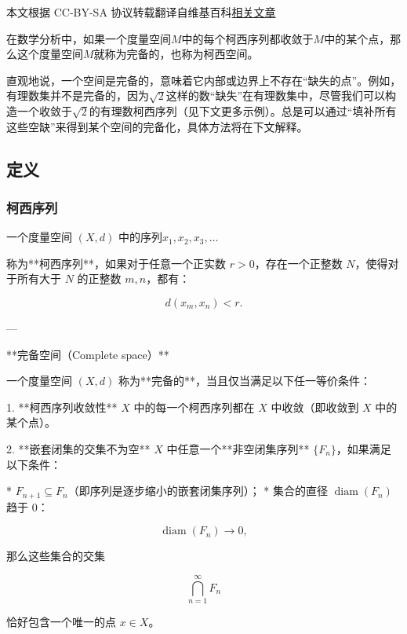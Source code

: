
本文根据 CC-BY-SA 协议转载翻译自维基百科\href{https://en.wikipedia.org/wiki/Complete_metric_space}{相关文章}

在数学分析中，如果一个度量空间$M$中的每个柯西序列都收敛于$M$中的某个点，那么这个度量空间$M$就称为完备的，也称为柯西空间。

直观地说，一个空间是完备的，意味着它内部或边界上不存在“缺失的点”。例如，有理数集并不是完备的，因为$\sqrt{2}$这样的数“缺失”在有理数集中，尽管我们可以构造一个收敛于$\sqrt{2}$的有理数柯西序列（见下文更多示例）。总是可以通过“填补所有这些空缺”来得到某个空间的完备化，具体方法将在下文解释。
\subsection{定义}
\subsubsection{柯西序列}
一个度量空间 $(X, d)$ 中的序列$x_{1}, x_{2}, x_{3}, \ldots$

称为**柯西序列**，如果对于任意一个正实数 $r > 0$，存在一个正整数 $N$，使得对于所有大于 $N$ 的正整数 $m, n$，都有：

$$
d(x_{m}, x_{n}) < r.
$$

---

**完备空间（Complete space）**

一个度量空间 $(X, d)$ 称为**完备的**，当且仅当满足以下任一等价条件：

1. **柯西序列收敛性**
   $X$ 中的每一个柯西序列都在 $X$ 中收敛（即收敛到 $X$ 中的某个点）。

2. **嵌套闭集的交集不为空**
   $X$ 中任意一个**非空闭集序列** $\{F_n\}$，如果满足以下条件：

   * $F_{n+1} \subseteq F_n$（即序列是逐步缩小的嵌套闭集序列）；
   * 集合的直径 $\operatorname{diam}(F_n)$ 趋于 0：

     $$
     \operatorname{diam}(F_n) \to 0,
     $$

   那么这些集合的交集

   $$
   \bigcap_{n=1}^{\infty} F_n
   $$

   恰好包含一个唯一的点 $x \in X$。
